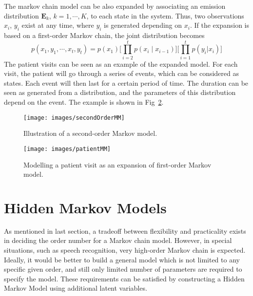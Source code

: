 The markov chain model can be also expanded by associating an emission distribution \(\mathbf{E}_k\), \(k = 1, \cdots , K\), to each state in the system. Thus, two observations \(x_i\), \(y_i\) exist at any time, where \(y_i\) is generated depending on \(x_i\). If the expansion is based on a first-order Markov chain, the joint distribution becomes
\begin{equation}
	p(x_1, y_1, \cdots, x_t, y_t) = p(x_1)\big[\prod_{i = 2}^{t} p(x_i \mid x_{i-1})\big]\big[\prod_{i=1}^{t}p(y_i|x_i)\big]
\end{equation}
The patient visits can be seen as an example of the expanded model. For each visit, the patient will go through a series of events, which can be considered as states. Each event will then last for a certain period of time. The duration can be seen as generated from a distribution, and the parameters of this distribution depend on the event. The example is shown in Fig~\ref{fig:patientMM}.

\begin{figure}[ht]
	\begin{center}
		\texttt{[image: images/secondOrderMM]}
		\caption{Illustration of a second-order Markov model.}
		\label{fig:secondOrderMM}
	\end{center}
\end{figure}

\begin{figure}[ht]
	\begin{center}
		\texttt{[image: images/patientMM]}
		\caption{Modelling a patient visit as an expansion of first-order Markov model.}
		\label{fig:patientMM}
	\end{center}
\end{figure}


\section{Hidden Markov Models}
\label{sec:HMM}
As mentioned in last section, a tradeoff between flexibility and practicality exists in deciding the order number for a Markov chain model. However, in special situations, such as speech recognition, very high-order Markov chain is expected. Ideally, it would be better to build a general model which is not limited to any specific given order, and still only limited number of parameters are required to specify the model. These requirements can be satisfied by constructing a Hidden Markov Model using additional latent variables. 

